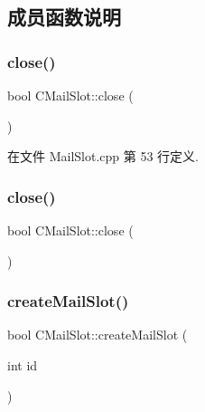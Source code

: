 \subsection{成员函数说明}
\mbox{\label{class_c_mail_slot_afc370072c2ab921ba66c55d1509262ad}} 
\subsubsection{\texorpdfstring{close()}{close()}\hspace{0.1cm}{\footnotesize\ttfamily [1/2]}}
{\footnotesize\ttfamily bool C\+Mail\+Slot\+::close (\begin{DoxyParamCaption}{ }\end{DoxyParamCaption})}



在文件 Mail\+Slot.\+cpp 第 53 行定义.

\mbox{\label{class_c_mail_slot_afc370072c2ab921ba66c55d1509262ad}} 
\subsubsection{\texorpdfstring{close()}{close()}\hspace{0.1cm}{\footnotesize\ttfamily [2/2]}}
{\footnotesize\ttfamily bool C\+Mail\+Slot\+::close (\begin{DoxyParamCaption}{ }\end{DoxyParamCaption})}

\mbox{\label{class_c_mail_slot_abdbc8ae85a1ae1f7c7998c43b1422535}} 
\subsubsection{\texorpdfstring{create\+Mail\+Slot()}{createMailSlot()}\hspace{0.1cm}{\footnotesize\ttfamily [1/2]}}
{\footnotesize\ttfamily bool C\+Mail\+Slot\+::create\+Mail\+Slot (\begin{DoxyParamCaption}\item[{int}]{id }\end{DoxyParamCaption})}



